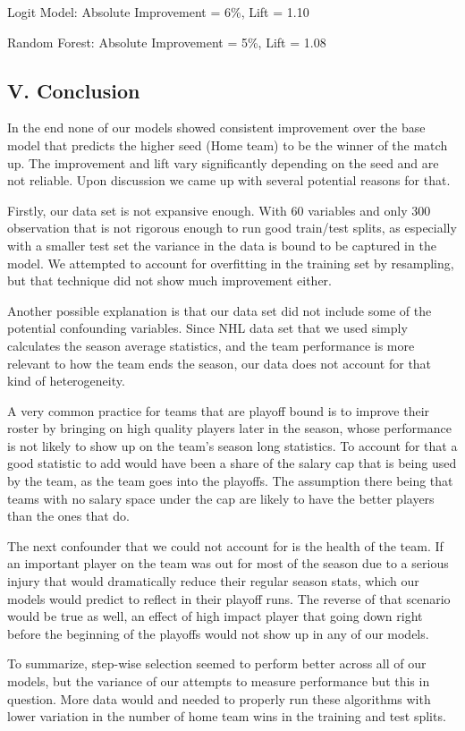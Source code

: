 \documentclass[
]{article}
\begin{document}
Logit Model: Absolute Improvement = 6\%, Lift = 1.10

Random Forest: Absolute Improvement = 5\%, Lift = 1.08

\hypertarget{v.-conclusion}{%
\subsection{V. Conclusion}\label{v.-conclusion}}

In the end none of our models showed consistent improvement over the
base model that predicts the higher seed (Home team) to be the winner of
the match up. The improvement and lift vary significantly depending on
the seed and are not reliable. Upon discussion we came up with several
potential reasons for that.

Firstly, our data set is not expansive enough. With 60 variables and
only 300 observation that is not rigorous enough to run good train/test
splits, as especially with a smaller test set the variance in the data
is bound to be captured in the model. We attempted to account for
overfitting in the training set by resampling, but that technique did
not show much improvement either.

Another possible explanation is that our data set did not include some
of the potential confounding variables. Since NHL data set that we used
simply calculates the season average statistics, and the team
performance is more relevant to how the team ends the season, our data
does not account for that kind of heterogeneity.

A very common practice for teams that are playoff bound is to improve
their roster by bringing on high quality players later in the season,
whose performance is not likely to show up on the team's season long
statistics. To account for that a good statistic to add would have been
a share of the salary cap that is being used by the team, as the team
goes into the playoffs. The assumption there being that teams with no
salary space under the cap are likely to have the better players than
the ones that do.

The next confounder that we could not account for is the health of the
team. If an important player on the team was out for most of the season
due to a serious injury that would dramatically reduce their regular
season stats, which our models would predict to reflect in their playoff
runs. The reverse of that scenario would be true as well, an effect of
high impact player that going down right before the beginning of the
playoffs would not show up in any of our models.

To summarize, step-wise selection seemed to perform better across all of
our models, but the variance of our attempts to measure performance but
this in question. More data would and needed to properly run these
algorithms with lower variation in the number of home team wins in the
training and test splits.
\end{document}
